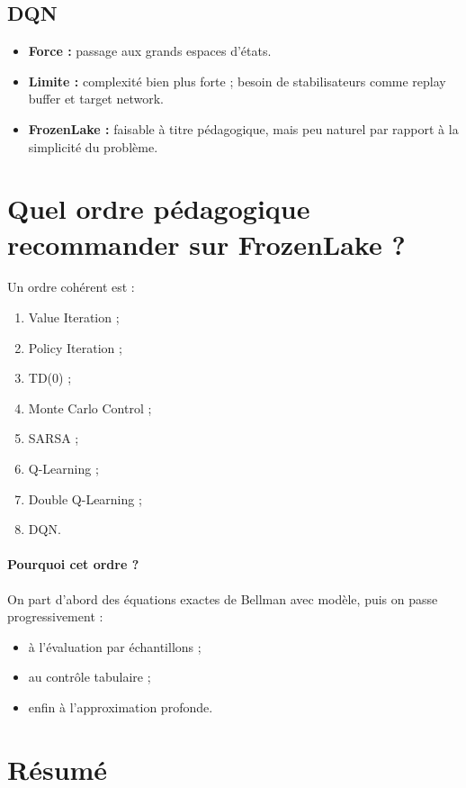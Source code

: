 \documentclass[11pt,a4paper]{article}
\begin{document}
\subsection{DQN}

\begin{itemize}[leftmargin=1.6em]
    \item \textbf{Force :} passage aux grands espaces d'états.
    \item \textbf{Limite :} complexité bien plus forte ; besoin de stabilisateurs comme replay buffer et target network.
    \item \textbf{FrozenLake :} faisable à titre pédagogique, mais peu naturel par rapport à la simplicité du problème.
\end{itemize}

\section{Quel ordre pédagogique recommander sur FrozenLake ?}

Un ordre cohérent est :
\begin{enumerate}[leftmargin=1.8em]
    \item Value Iteration ;
    \item Policy Iteration ;
    \item TD(0) ;
    \item Monte Carlo Control ;
    \item SARSA ;
    \item Q-Learning ;
    \item Double Q-Learning ;
    \item DQN.
\end{enumerate}

\paragraph{Pourquoi cet ordre ?}
On part d'abord des équations exactes de Bellman avec modèle, puis on passe progressivement :
\begin{itemize}[leftmargin=1.6em]
    \item à l'évaluation par échantillons ;
    \item au contrôle tabulaire ;
    \item enfin à l'approximation profonde.
\end{itemize}

\section{Résumé}
\end{document}
